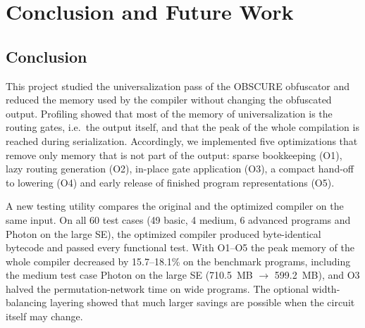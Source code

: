 \documentclass[12pt,a4paper,oneside]{report}
\begin{document}
\chapter{Conclusion and Future Work}

\section{Conclusion}
This project studied the universalization pass of the OBSCURE obfuscator and reduced the memory
used by the compiler without changing the obfuscated output. Profiling showed that most of the
memory of universalization is the routing gates, i.e.\ the output itself, and that the peak of
the whole compilation is reached during serialization. Accordingly, we implemented five
optimizations that remove only memory that is not part of the output: sparse bookkeeping (O1),
lazy routing generation (O2), in-place gate application (O3), a compact hand-off to lowering (O4)
and early release of finished program representations (O5).

A new testing utility compares the original and the optimized compiler on the same input. On
all 60 test cases (49 basic, 4 medium, 6 advanced programs and Photon on the large SE), the
optimized compiler produced byte-identical bytecode and passed every functional test.
With O1--O5 the peak memory of the whole compiler decreased by 15.7--18.1\% on the benchmark
programs, including the medium
test case Photon on the large SE (710.5~MB $\rightarrow$ 599.2~MB), and O3 halved the
permutation-network time on wide programs. The optional width-balancing layering showed that much
larger savings are possible when the circuit itself may change.
\end{document}
